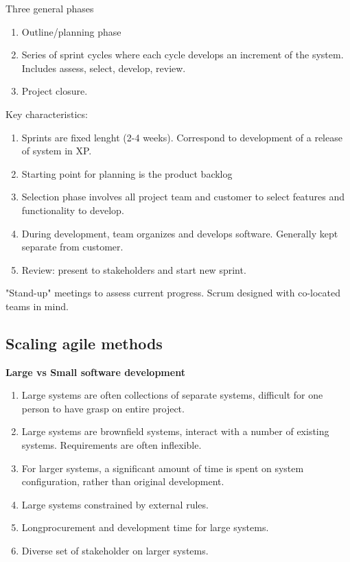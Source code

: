 \documentclass{article}
\begin{document}
Three general phases
\begin{enumerate}
    \item Outline/planning phase
    \item Series of sprint cycles where each cycle develops an increment of the system.  Includes assess, select, develop, review.
    \item Project closure. 
\end{enumerate}

Key characteristics:
\begin{enumerate}
    \item Sprints are fixed lenght (2-4 weeks).  Correspond to development of a release of system in XP.
    \item Starting point for planning is the product backlog
    \item Selection phase involves all project team and customer to select features and functionality to develop.
    \item During development, team organizes and develops software.  Generally kept separate from customer.
    \item Review: present to stakeholders and start new sprint.
\end{enumerate}

"Stand-up" meetings to assess current progress.  Scrum designed with co-located teams in mind.

\subsection{Scaling agile methods}
\textbf{Large vs Small software development}
\begin{enumerate}
    \item Large systems are often collections of separate systems, difficult for one person to have grasp on entire project.
    \item Large systems are brownfield systems, interact with a number of existing systems.  Requirements are often inflexible.
    \item For larger systems, a significant amount of time is spent on system configuration, rather than original development.
    \item Large systems constrained by external rules.
    \item Longprocurement and development time for large systems.
    \item Diverse set of stakeholder on larger systems.
\end{enumerate}
\end{document}
